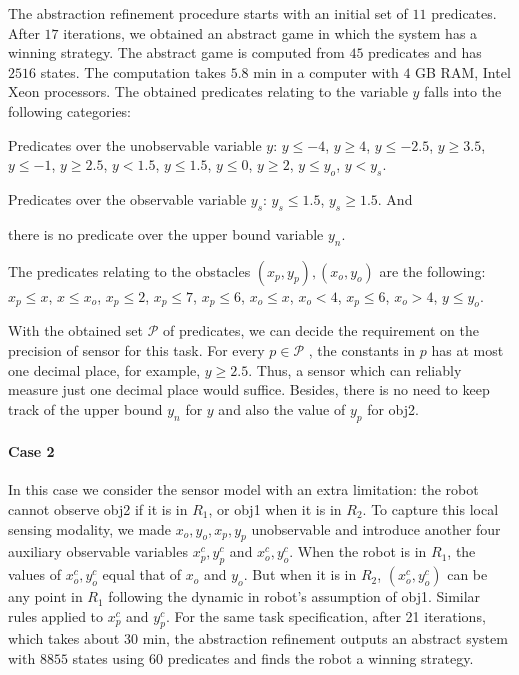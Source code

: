 \documentclass[letterpaper, 10 pt, conference]{ieeeconf}
\begin{document}
The abstraction refinement procedure starts with an initial set of
$11$ predicates. After $17$ iterations, we obtained an abstract game
in which the system has a winning strategy. The abstract game is
computed from $45$ predicates and has $2516$ states. The computation
takes $5.8$ min in a computer with $4$ GB RAM, Intel Xeon
processors. The obtained predicates relating to the variable $y$ falls
into the following categories:
\begin{inparaenum}[(1)]\item
Predicates over the unobservable variable $y$: $y \le -4$, $ y \ge
4$, $y\le -2.5$, $y\ge 3.5$, $y \le -1$, $y\ge 2.5$, $y< 1.5$, $y \le
1.5$, $y \le 0$, $y\ge 2$, $y \le y_o$, $y < y_s$.
\item
Predicates over the observable variable $y_s$:  $y_s\le
1.5$, $y_s \ge 1.5$. And \item there is no predicate over the upper bound
variable $y_n$.
\end{inparaenum} The predicates relating to the obstacles $(x_p,y_p),
(x_o,y_o)$ are the following: $x_p \le x $, $x \le x_o$, $x_p
\le 2$, $x_p \le 7$, $x_p \le 6$, $x_o \le x $, $x_o < 4$, $x_p \le
6$, $x_o > 4$, $y\le y_o $. 

With the obtained set  $\mathcal{P}$ of predicates, we can decide the
requirement on the precision of sensor for this task. For
every $p\in \mathcal{P}$ , the constants in $p$ has at most one
decimal place, for example, $y\ge 2.5$. Thus, a sensor which can
reliably measure just one decimal place would suffice. Besides, there is no need to keep track of the upper bound $y_n$ for
$y$ and also the value of  $y_p$ for obj2.

\paragraph*{Case 2}In this case we consider the sensor model with an
extra limitation: the robot cannot observe obj2 if it is in $R_1$, or
obj1 when it is in $R_2$. To capture this local sensing modality, we
made $x_o,y_o,x_p,y_p$ unobservable and introduce another four
auxiliary observable variables $x_p^c,y_p^c$ and $x_o^c, y_o^c$. When
the robot is in $R_1$, the values of $x_o^c,y_o^c$ equal that of $x_o$
and $y_o$. But when it is in $R_2$, $(x_o^c,y_o^c)$ can be any point
in $R_1$ following the dynamic in robot's assumption of obj1.  Similar
rules applied to $x_p^c $ and $y^c_p$. For the same task
specification, after 21 iterations, which takes about $30$ min, the
abstraction refinement outputs an abstract system with $8855$ states
using $60$ predicates and finds the robot a winning strategy.
\end{document}
